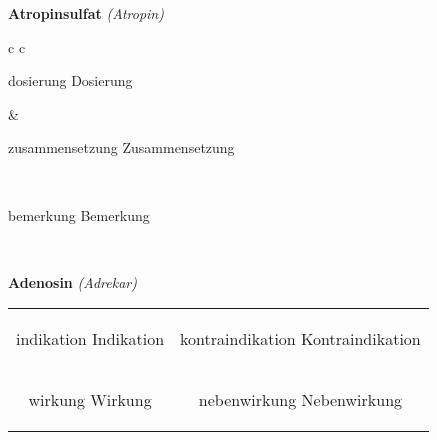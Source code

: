 \documentclass[12pt]{beamer}
\begin{document}
\begin{frame}{
    \textbf{Atropinsulfat}
    \textit{(Atropin)}
}
    \begin{tabular}{c c}
        \begin{beamercolorbox}[wd=\boxwidth\textwidth,ht=\boxheight\textheight,sep=1em]{dosierung}
        Dosierung
        \end{beamercolorbox} & 
        \begin{beamercolorbox}[wd=\boxwidth\textwidth,ht=\boxheight\textheight,sep=1em]{zusammensetzung}
        Zusammensetzung
        \end{beamercolorbox} \\
        \begin{beamercolorbox}[wd=\textwidth,ht=\boxheight\textheight,sep=1em]{bemerkung}
        Bemerkung
        \end{beamercolorbox} \\
    \end{tabular}
\end{frame}

\begin{frame}{
    \textbf{Adenosin}
    \textit{(Adrekar)}
}
    \begin{tabular}{c c}
        \begin{beamercolorbox}[wd=\boxwidth\textwidth,ht=\boxheight\textheight,sep=1em]{indikation}
        Indikation
        \end{beamercolorbox} & 
        \begin{beamercolorbox}[wd=\boxwidth\textwidth,ht=\boxheight\textheight,sep=1em]{kontraindikation}
        Kontraindikation 
        \end{beamercolorbox} \\
        \begin{beamercolorbox}[wd=\boxwidth\textwidth,ht=\boxheight\textheight,sep=1em]{wirkung}
        Wirkung
        \end{beamercolorbox} & 
        \begin{beamercolorbox}[wd=\boxwidth\textwidth,ht=\boxheight\textheight,sep=1em]{nebenwirkung}
        Nebenwirkung
        \end{beamercolorbox} \\
    \end{tabular}
\end{frame}
\end{document}
